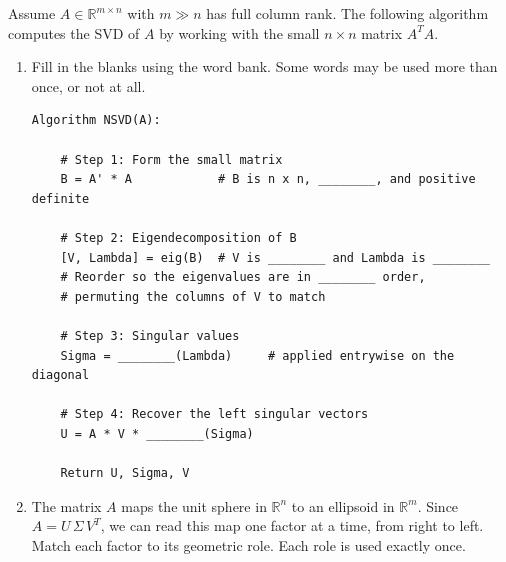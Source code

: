 \documentclass{ximera}
\begin{document}
\begin{exercise}

Assume $A \in \mathbb{R}^{m\times n}$ with $m \gg n$ has full column rank.
The following algorithm computes the SVD of $A$ by working with the small
$n\times n$ matrix $A^TA$.

\begin{enumerate}

\item Fill in the blanks using the word bank. Some words may be used
more than once, or not at all.

\begin{center}
\end{center}

\begin{lstlisting}
Algorithm NSVD(A):

    # Step 1: Form the small matrix
    B = A' * A            # B is n x n, ________, and positive definite

    # Step 2: Eigendecomposition of B
    [V, Lambda] = eig(B)  # V is ________ and Lambda is ________
    # Reorder so the eigenvalues are in ________ order,
    # permuting the columns of V to match

    # Step 3: Singular values
    Sigma = ________(Lambda)     # applied entrywise on the diagonal

    # Step 4: Recover the left singular vectors
    U = A * V * ________(Sigma)

    Return U, Sigma, V
\end{lstlisting}

\item The matrix $A$ maps the unit sphere in $\mathbb{R}^n$ to an
ellipsoid in $\mathbb{R}^m$. Since $A = U\,\Sigma\,V^T$, we can read
this map one factor at a time, from right to left.
Match each factor to its geometric role. Each role is used exactly once.

\begin{center}
\end{center}


\end{enumerate}
\end{exercise}
\end{document}
